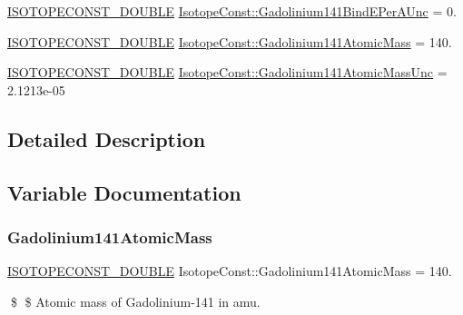 \begin{DoxyCompactItemize}
\item 
\mbox{\hyperlink{group___isotope_const-_macros_ga8f45a7272ce02c0b4c65c44636ed719a}{I\+S\+O\+T\+O\+P\+E\+C\+O\+N\+S\+T\+\_\+\+D\+O\+U\+B\+LE}} \mbox{\hyperlink{group___isotope_const-_gadolinium-_gd141_ga714deecfcca7f1b161ea0193ee99887a}{Isotope\+Const\+::\+Gadolinium141\+Bind\+E\+Per\+A\+Unc}} = 0.
\item 
\mbox{\hyperlink{group___isotope_const-_macros_ga8f45a7272ce02c0b4c65c44636ed719a}{I\+S\+O\+T\+O\+P\+E\+C\+O\+N\+S\+T\+\_\+\+D\+O\+U\+B\+LE}} \mbox{\hyperlink{group___isotope_const-_gadolinium-_gd141_gaba12f88c4b7c784454fc707507d59072}{Isotope\+Const\+::\+Gadolinium141\+Atomic\+Mass}} = 140.
\item 
\mbox{\hyperlink{group___isotope_const-_macros_ga8f45a7272ce02c0b4c65c44636ed719a}{I\+S\+O\+T\+O\+P\+E\+C\+O\+N\+S\+T\+\_\+\+D\+O\+U\+B\+LE}} \mbox{\hyperlink{group___isotope_const-_gadolinium-_gd141_gaf61d8bf93f41efb6cba5368f343485e0}{Isotope\+Const\+::\+Gadolinium141\+Atomic\+Mass\+Unc}} = 2.\+1213e-\/05
\end{DoxyCompactItemize}


\subsection{Detailed Description}


\subsection{Variable Documentation}
\mbox{\label{group___isotope_const-_gadolinium-_gd141_gaba12f88c4b7c784454fc707507d59072}} 
\subsubsection{\texorpdfstring{Gadolinium141\+Atomic\+Mass}{Gadolinium141AtomicMass}}
{\footnotesize\ttfamily \mbox{\hyperlink{group___isotope_const-_macros_ga8f45a7272ce02c0b4c65c44636ed719a}{I\+S\+O\+T\+O\+P\+E\+C\+O\+N\+S\+T\+\_\+\+D\+O\+U\+B\+LE}} Isotope\+Const\+::\+Gadolinium141\+Atomic\+Mass = 140.}

\$ \$ Atomic mass of Gadolinium-\/141 in amu. \mbox{\label{group___isotope_const-_gadolinium-_gd141_gaf61d8bf93f41efb6cba5368f343485e0}} 
